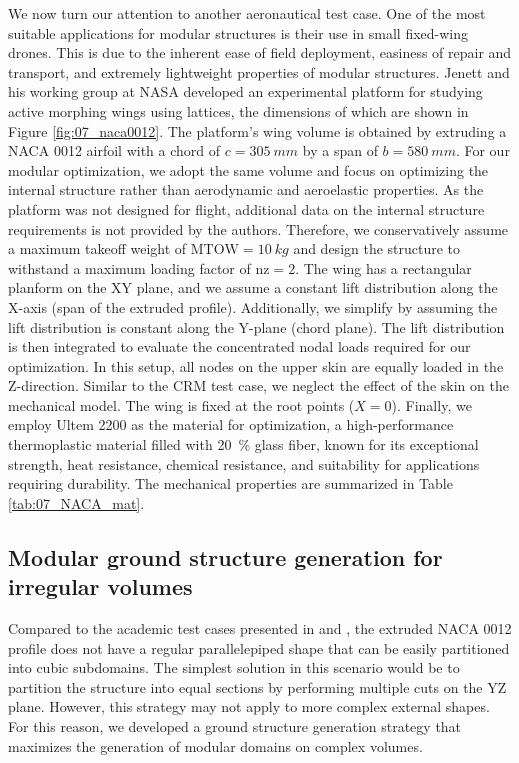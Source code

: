 We now turn our attention to another aeronautical test case. One of the most suitable applications for modular structures is their use in small fixed-wing drones. This is due to the inherent ease of field deployment, easiness of repair and transport, and extremely lightweight properties of modular structures. Jenett and his working group at NASA developed an experimental platform for studying active morphing wings using lattices, the dimensions of which are shown in Figure \ref{fig:07_naca0012}. The platform's wing volume is obtained by extruding a NACA 0012 airfoil with a chord of $c=\qty{305}{mm}$ by a span of $b=\qty{580}{mm}$. For our modular optimization, we adopt the same volume and focus on optimizing the internal structure rather than aerodynamic and aeroelastic properties. As the platform was not designed for flight, additional data on the internal structure requirements is not provided by the authors. Therefore, we conservatively assume a maximum takeoff weight of $\text{MTOW}=\qty{10}{kg}$ and design the structure to withstand a maximum loading factor of $\text{nz}=2$. The wing has a rectangular planform on the XY plane, and we assume a constant lift distribution along the X-axis (span of the extruded profile). Additionally, we simplify by assuming the lift distribution is constant along the Y-plane (chord plane). The lift distribution is then integrated to evaluate the concentrated nodal loads required for our optimization. In this setup, all nodes on the upper skin are equally loaded in the Z-direction. Similar to the CRM test case, we neglect the effect of the skin on the mechanical model. The wing is fixed at the root points ($X=0$). Finally, we employ Ultem 2200 as the material for optimization, a high-performance thermoplastic material filled with \qty{20}{\percent} glass fiber, known for its exceptional strength, heat resistance, chemical resistance, and suitability for applications requiring durability. The mechanical properties are summarized in Table \ref{tab:07_NACA_mat}.

\subsection{Modular ground structure generation for irregular volumes}
Compared to the academic test cases presented in  and , the extruded NACA 0012 profile does not have a regular parallelepiped shape that can be easily partitioned into cubic subdomains. The simplest solution in this scenario would be to partition the structure into equal sections by performing multiple cuts on the YZ plane. However, this strategy may not apply to more complex external shapes. For this reason, we developed a ground structure generation strategy that maximizes the generation of modular domains on complex volumes.

